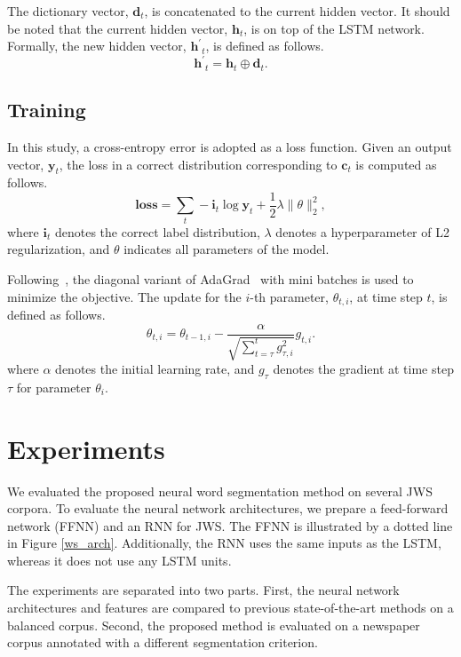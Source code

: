\documentclass[11pt]{article}
\begin{document}
The dictionary vector, $\bm{d}_t$, is concatenated to the current hidden
vector. It should be noted that the current hidden vector, $\bm{h}_t$, is on
top of the LSTM network.
Formally, the new hidden vector, $\bm{h^{\prime}}_t$, is defined as follows.
\begin{equation}  
\bm{h^{\prime}}_t = \bm{h}_t \oplus \bm{d}_t.
\end{equation}

\subsection{Training}
In this study, a cross-entropy error is adopted as a loss function. Given an
output vector, $\bm{y}_t$, the loss in a correct distribution corresponding to
$\bm{c}_t$ is computed as follows.
\begin{equation} 
 \bm{loss} = \sum_{t} -\bm{i}_t \log \bm{y}_t +  \frac{1}{2}\lambda
    \|\theta\|_{2}^2,
\end{equation}
where $\bm{i}_t$ denotes the correct label distribution, $\lambda$ denotes a
hyperparameter of L2 regularization, and $\theta$ indicates all parameters of
the model.
 
Following~\cite{socher2013parsing}, the diagonal variant of
AdaGrad~\cite{duchi2011adaptive} with mini batches is used to minimize the
objective. The update for the $i$-th parameter, $\theta_{t,i}$, at time step
$t$, is defined as follows.
\begin{equation}
\theta_{t,i} = \theta_{t-1,i} - \frac{\alpha }{\sqrt{\sum^{t}_{t=\tau}
    g^{2}_{\tau,i}}}g_{t,i}.
\end{equation}
where $\alpha$ denotes the initial learning rate, and $g_{\tau}$ denotes the gradient at time step $\tau$ for parameter $\theta_{i}$. 

\section{Experiments}


We evaluated the proposed neural word segmentation method on several JWS corpora.
To evaluate the neural network architectures, we prepare a feed-forward
network (FFNN) and an RNN for JWS. The FFNN is
illustrated by a dotted line in Figure \ref{ws_arch}. Additionally, the RNN
uses the same inputs as the LSTM, whereas it does not use any LSTM units.

The experiments are separated into two parts. First, the neural network
architectures and features are compared to previous state-of-the-art methods
on a balanced corpus. 
Second, the proposed method is evaluated on a newspaper corpus annotated with
a different segmentation criterion.
\end{document}
